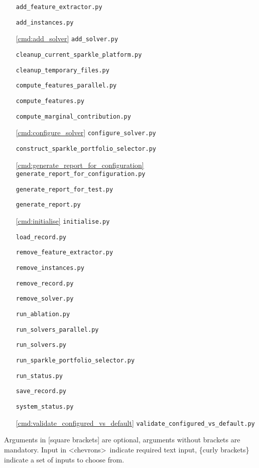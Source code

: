 \documentclass{article}
\begin{document}
\begin{itemize}[noitemsep]
  \item[] \texttt{add\_feature\_extractor.py}
  \item[] \texttt{add\_instances.py}
  \item[\ref{cmd:add_solver}] \texttt{add\_solver.py}
  \item[] \texttt{cleanup\_current\_sparkle\_platform.py}
  \item[] \texttt{cleanup\_temporary\_files.py}
  \item[] \texttt{compute\_features\_parallel.py}
  \item[] \texttt{compute\_features.py}
  \item[] \texttt{compute\_marginal\_contribution.py}
  \item[\ref{cmd:configure_solver}] \texttt{configure\_solver.py}
  \item[] \texttt{construct\_sparkle\_portfolio\_selector.py}
  \item[\ref{cmd:generate_report_for_configuration}] \texttt{generate\_report\_for\_configuration.py}
  \item[] \texttt{generate\_report\_for\_test.py}
  \item[] \texttt{generate\_report.py}
  \item[\ref{cmd:initialise}] \texttt{initialise.py}
  \item[] \texttt{load\_record.py}
  \item[] \texttt{remove\_feature\_extractor.py}
  \item[] \texttt{remove\_instances.py}
  \item[] \texttt{remove\_record.py}
  \item[] \texttt{remove\_solver.py}
  \item[] \texttt{run\_ablation.py}
  \item[] \texttt{run\_solvers\_parallel.py}
  \item[] \texttt{run\_solvers.py}
  \item[] \texttt{run\_sparkle\_portfolio\_selector.py}
  \item[] \texttt{run\_status.py}
  \item[] \texttt{save\_record.py}
  \item[] \texttt{system\_status.py}
  \item[\ref{cmd:validate_configured_vs_default}] \texttt{validate\_configured\_vs\_default.py}
\end{itemize}

Arguments in [square brackets] are optional, arguments without brackets are mandatory. Input in \textless chevrons\textgreater~indicate required text input, \{curly brackets\} indicate a set of inputs to choose from.
\end{document}
